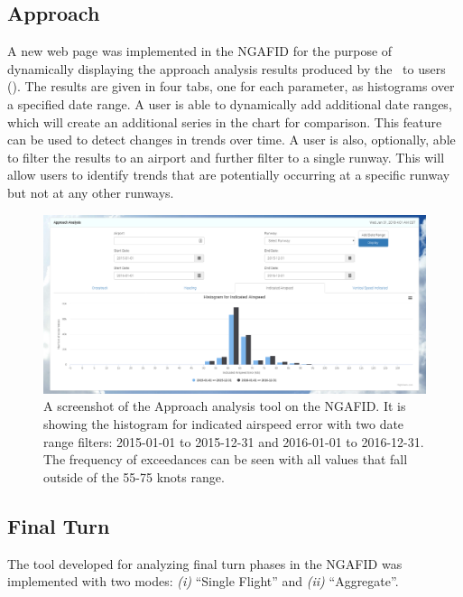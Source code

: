     
    \subsection{Approach}
    
    	A new web page was implemented in the NGAFID for the purpose of dynamically displaying the approach analysis results produced by the \toolname\ to users ().  The results are given in four tabs, one for each parameter, as histograms over a specified date range.  A user is able to dynamically add additional date ranges, which will create an additional series in the chart for comparison.  This feature can be used to detect changes in trends over time.  A user is also, optionally, able to filter the results to an airport and further filter to a single runway.  This will allow users to identify trends that are potentially occurring at a specific runway but not at any other runways.
    
    	\begin{figure}
    		\centering
            \includegraphics[width=\linewidth]{img/approach_tool_screenshot}
            \caption{A screenshot of the Approach analysis tool on the NGAFID.  It is showing the histogram for indicated airspeed error with two date range filters: 2015-01-01 to 2015-12-31 and 2016-01-01 to 2016-12-31.  The frequency of exceedances can be seen with all values that fall outside of the 55-75 knots range.}
            \label{fig:approach_tool_screenshot}
    	\end{figure}
    
    
    \subsection{Final Turn}
    
    	The tool developed for analyzing final turn phases in the NGAFID was implemented with two modes:  \textit{(i)} ``Single Flight'' and \textit{(ii)} ``Aggregate''.
    

